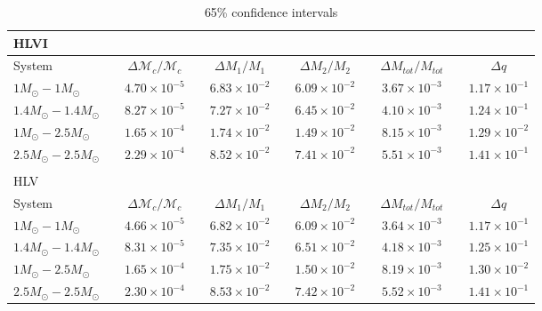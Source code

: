 \documentclass[11pt,a4paper]{emulateapj}
\newcommand{\carl}[1]{{\color{red}  #1}}
\newcommand{\chmass}{\mathcal{M}_c}
\begin{document}
\begin{table}[t!]
\centering
\caption{\carl{65\% confidence intervals}}
\begin{tabular}{lcccccccccc}

\\HLVI\\
\hline\hline
System & \vline &  $\Delta \chmass / \chmass$ & \vline & $\Delta M_1 / M_1$ & \vline & $\Delta M_2 / M_2$ & \vline & $\Delta M_{tot}/M_{tot}$ & \vline & $\Delta q$\\
\hline\hline
$1M_{\odot}-1M_{\odot}$ & \vline & $4.70\times 10^{-5}$ & \vline & $6.83\times 10^{-2}$ & \vline & $6.09\times 10^{-2}$ & \vline & $3.67\times 10^{-3}$ & \vline & $1.17\times 10^{-1}$\\
\hline
$1.4M_{\odot}-1.4M_{\odot}$ & \vline & $8.27\times 10^{-5}$ & \vline & $7.27\times 10^{-2}$ & \vline & $6.45\times 10^{-2}$ & \vline & $4.10\times 10^{-3}$ & \vline & $1.24\times 10^{-1}$ \\
\hline
$1M_{\odot}-2.5M_{\odot}$ & \vline & $1.65\times 10^{-4}$ & \vline & $1.74\times 10^{-2}$ & \vline & $1.49\times 10^{-2}$ & \vline & $8.15\times 10^{-3}$ & \vline & $1.29\times 10^{-2}$\\\hline
$2.5M_{\odot}-2.5M_{\odot}$ & \vline & $2.29\times 10^{-4}$ & \vline & $8.52\times 10^{-2}$ & \vline & $7.41\times 10^{-2}$ & \vline & $5.51\times 10^{-3}$ & \vline & $1.41\times 10^{-1}$\\
\hline\hline

\\
HLV\\

\hline\hline
System & \vline &  $\Delta \chmass / \chmass$ & \vline & $\Delta M_1 / M_1$ & \vline & $\Delta M_2 / M_2$ & \vline & $\Delta M_{tot}/M_{tot}$ & \vline & $\Delta q$\\
\hline\hline
$1M_{\odot}-1M_{\odot}$ & \vline & $4.66\times 10^{-5}$ & \vline & $6.82\times 10^{-2}$ & \vline & $6.09\times 10^{-2}$ & \vline & $3.64\times 10^{-3}$ & \vline & $1.17\times 10^{-1}$ \\
\hline
$1.4M_{\odot}-1.4M_{\odot}$ & \vline & $8.31\times 10^{-5}$ & \vline & $7.35\times 10^{-2}$ & \vline & $6.51\times 10^{-2}$ & \vline & $4.18\times 10^{-3}$ & \vline & $1.25\times 10^{-1}$\\
\hline
$1M_{\odot}-2.5M_{\odot}$ & \vline & $1.65\times 10^{-4}$ & \vline & $1.75\times 10^{-2}$ & \vline & $1.50\times 10^{-2}$ & \vline & $8.19\times 10^{-3}$ & \vline & $1.30\times 10^{-2}$ \\
\hline
$2.5M_{\odot}-2.5M_{\odot}$ & \vline & $2.30\times 10^{-4}$ & \vline & $8.53\times 10^{-2}$ & \vline & $7.42\times 10^{-2}$ & \vline & $5.52\times 10^{-3}$ & \vline & $1.41\times 10^{-1}$ \\
\hline\hline


\end{tabular}
\label{ciTableIntrinsic}
\end{table}
\end{document}
